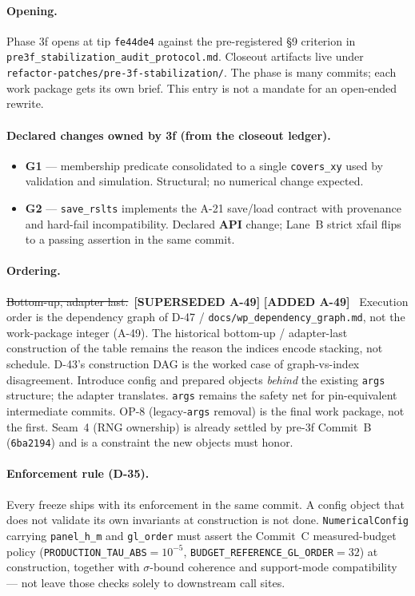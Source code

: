 \documentclass[
  10pt,
]{article}
\providecommand{\tightlist}{%
  \setlength{\itemsep}{0pt}\setlength{\parskip}{0pt}}
\newcommand{\amdstrike}[1]{\sout{#1}}
\newcommand{\amdstrike}[1]{\textcolor{supcolor}{#1}}
\newcommand{\amdnew}[1]{{\color{amdcolor}\footnotesize\textbf{[ADDED #1]}}\ }
\newcommand{\supsd}[2]{{\color{supcolor}\amdstrike{#2}}~{\color{amdcolor}\footnotesize\textbf{[SUPERSEDED #1]}}}
\begin{document}
\paragraph{Opening.}
Phase 3f opens at tip \texttt{fe44de4} against the pre-registered §9 criterion in \texttt{pre3f\_stabilization\_audit\_protocol.md}. Closeout artifacts live under \texttt{refactor-patches/pre-3f-stabilization/}. The phase is many commits; each work package gets its own brief. This entry is not a mandate for an open-ended rewrite.

\paragraph{Declared changes owned by 3f (from the closeout ledger).}
\begin{itemize}
\tightlist
\item \textbf{G1} --- membership predicate consolidated to a single \texttt{covers\_xy} used by validation and simulation. Structural; no numerical change expected.
\item \textbf{G2} --- \texttt{save\_rslts} implements the A-21 save/load contract with provenance and hard-fail incompatibility. Declared \textbf{API} change; Lane~B strict xfail flips to a passing assertion in the same commit.
\end{itemize}

\paragraph{Ordering.}
\supsd{A-49}{Bottom-up, adapter last.} \amdnew{A-49} Execution order is the dependency graph of D-47 / \texttt{docs/wp\_dependency\_graph.md}, not the work-package integer (A-49). The historical bottom-up / adapter-last construction of the table remains the reason the indices encode stacking, not schedule. D-43's construction DAG is the worked case of graph-vs-index disagreement.
Introduce config and prepared objects \emph{behind} the existing \texttt{args} structure; the adapter translates. \texttt{args} remains the safety net for pin-equivalent intermediate commits. OP-8 (legacy-\texttt{args} removal) is the final work package, not the first. Seam~4 (RNG ownership) is already settled by pre-3f Commit~B (\texttt{6ba2194}) and is a constraint the new objects must honor.

\paragraph{Enforcement rule (D-35).}
Every freeze ships with its enforcement in the same commit. A config object that does not validate its own invariants at construction is not done. \texttt{NumericalConfig} carrying \texttt{panel\_h\_m} and \texttt{gl\_order} must assert the Commit~C measured-budget policy (\texttt{PRODUCTION\_TAU\_ABS}${}={}10^{-5}$, \texttt{BUDGET\_REFERENCE\_GL\_ORDER}${}={}32$) at construction, together with $\sigma$-bound coherence and support-mode compatibility --- not leave those checks solely to downstream call sites.
\end{document}
